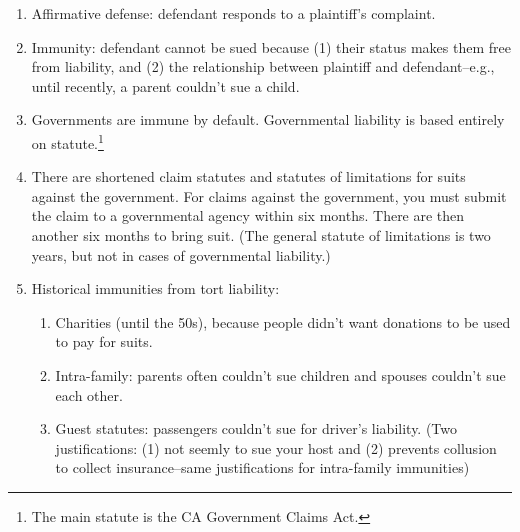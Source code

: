 \begin{enumerate}
    \item Affirmative defense: defendant responds to a plaintiff's complaint.
    \item Immunity: defendant cannot be sued because (1) their status makes them free from liability, and (2) the relationship between plaintiff and defendant--e.g., until recently, a parent couldn't sue a child.
    \item Governments are immune by default. Governmental liability is based entirely on statute.\footnote{The main statute is the CA Government Claims Act.}
    \item There are shortened claim statutes and statutes of limitations for suits against the government. For claims against the government, you must submit the claim to a governmental agency within six months. There are then another six months to bring suit. (The general statute of limitations is two years, but not in cases of governmental liability.)
    \item Historical immunities from tort liability:
    \begin{enumerate}
        \item Charities (until the 50s), because people didn't want donations to be used to pay for suits.
        \item Intra-family: parents often couldn't sue children and spouses couldn't sue each other.
        \item Guest statutes: passengers couldn't sue for driver's liability. (Two justifications: (1) not seemly to sue your host and (2) prevents collusion to collect insurance--same justifications for intra-family immunities)
    \end{enumerate}
\end{enumerate}

